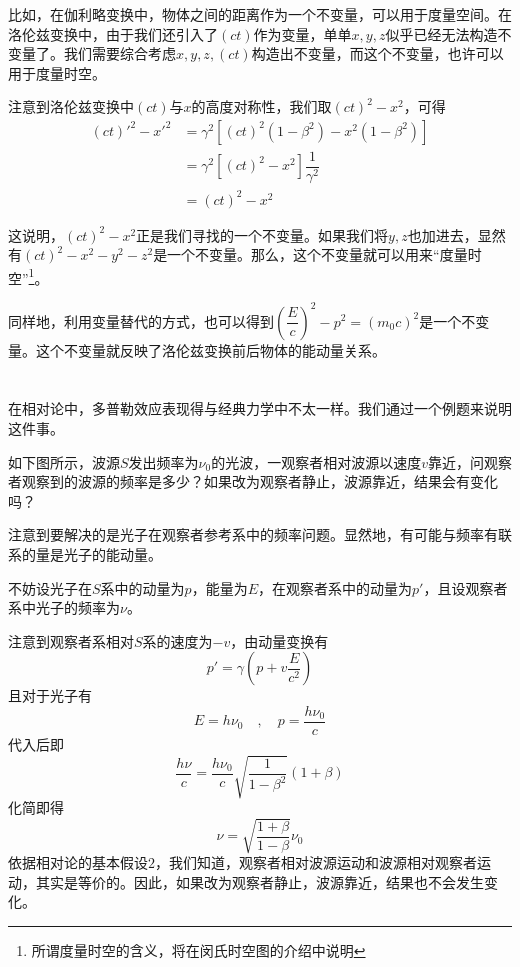 比如，在伽利略变换中，物体之间的距离作为一个不变量，可以用于度量空间。在洛伦兹变换中，由于我们还引入了$(ct)$作为变量，单单$x,y,z$似乎已经无法构造不变量了。我们需要综合考虑$x,y,z,(ct)$构造出不变量，而这个不变量，也许可以用于度量时空。

注意到洛伦兹变换中$(ct)$与$x$的高度对称性，我们取$(ct)^2-x^2$，可得
\begin{equation}
    \begin{aligned}
        {(ct)'}^2-{x'}^2 & =\gamma^2[(ct)^2(1-\beta^2)-x^2(1-\beta^2)] \\
                         & =\gamma^2[(ct)^2-x^2]\dfrac{1}{\gamma^2}    \\
                         & =(ct)^2-x^2
    \end{aligned}
\end{equation}

这说明，$(ct)^2-x^2$正是我们寻找的一个不变量。如果我们将$y,z$也加进去，显然有$(ct)^2-x^2-y^2-z^2$是一个不变量。那么，这个不变量就可以用来``度量时空''\footnote{所谓度量时空的含义，将在闵氏时空图的介绍中说明}。

同样地，利用变量替代的方式，也可以得到$\left(\dfrac{E}{c}\right)^2-p^2=\left(m_0c\right)^2$是一个不变量。这个不变量就反映了洛伦兹变换前后物体的能动量关系。
\section[多普勒效应]{}
在相对论中，多普勒效应表现得与经典力学中不太一样。我们通过一个例题来说明这件事。
\begin{ex}[光的多普勒效应]
    如下图所示，波源$S$发出频率为$\nu_0$的光波，一观察者相对波源以速度$v$靠近，问观察者观察到的波源的频率是多少？如果改为观察者静止，波源靠近，结果会有变化吗？
\end{ex}
\begin{so}[光的多普勒效应]
    注意到要解决的是光子在观察者参考系中的频率问题。显然地，有可能与频率有联系的量是光子的能动量。

    不妨设光子在$S$系中的动量为$p$，能量为$E$，在观察者系中的动量为$p'$，且设观察者系中光子的频率为$\nu$。

    注意到观察者系相对$S$系的速度为$-v$，由动量变换有
    \[p'=\gamma\left(p+v\frac{E}{c^2}\right)\]
    且对于光子有
    \[E=h\nu_0\quad,\quad p=\dfrac{h\nu_0}{c}\]
    代入后即
    \[\frac{h\nu}{c}=\frac{h\nu_0}{c}\sqrt{\frac{1}{1-\beta^2}}(1+\beta)\]
    化简即得
    \[\nu=\sqrt{\frac{1+\beta}{1-\beta}}\nu_0\]
    依据相对论的基本假设$2$，我们知道，观察者相对波源运动和波源相对观察者运动，其实是等价的。因此，如果改为观察者静止，波源靠近，结果也不会发生变化。
\end{so}
